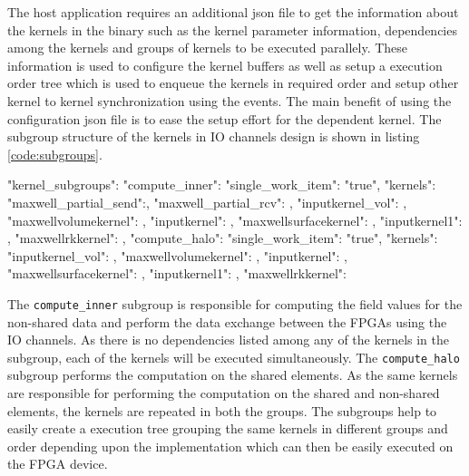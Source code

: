 The host application requires an additional json file to get the information about the kernels in the binary such as
the kernel parameter information, dependencies among the kernels and groups of kernels to be executed parallely.
These information is used to configure the kernel buffers as well as setup a execution order tree which is used
to enqueue the kernels in required order and setup other kernel to kernel synchronization using the events.
The main benefit of using the configuration json file is to ease the setup effort for the dependent kernel.
The subgroup structure of the kernels in IO channels design is shown in listing \ref{code:subgroups}.

\begin{JsonCode}[caption=Kernel subgroups used in Multi FPGA design to enqueue kernels, frame=tlrb, label=code:subgroups]
"kernel_subgroups":
{
    "compute_inner":
    {
        "single_work_item": "true",
        "kernels":
        {
            "maxwell_partial_send":{},
            "maxwell_partial_rcv": {},
            "inputkernel_vol": {},
            "maxwellvolumekernel": {},
            "inputkernel": {},
            "maxwellsurfacekernel": {},
            "inputkernel1": {},
            "maxwellrkkernel": {}
        }
    },
    "compute_halo":
    {
        "single_work_item": "true",
        "kernels":
        {
            "inputkernel_vol": {},
            "maxwellvolumekernel": {},
            "inputkernel": {},
            "maxwellsurfacekernel": {},
            "inputkernel1": {},
            "maxwellrkkernel": {}
        }
    }
}
\end{JsonCode}

The \texttt{compute\_inner} subgroup is responsible for computing the field values for the non-shared
data and perform the data exchange between the FPGAs using the IO channels. As there is no dependencies
listed among any of the kernels in the subgroup, each of the kernels will be executed simultaneously.
The \texttt{compute\_halo} subgroup performs the computation on the shared elements. As the same kernels
are responsible for performing the computation on the shared and non-shared elements, the kernels are
repeated in both the groups. The subgroups help to easily create a execution tree grouping
the same kernels in different groups and order depending upon the implementation which can then be
easily executed on the FPGA device.

